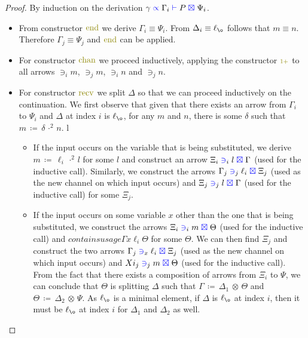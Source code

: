 \documentclass[a4paper,UKenglish,cleveref, autoref, thm-restate,authorcolumns]{lipics-v2019}
\theoremstyle{definition}
\newcommand{\type}[1]{\textcolor{blue}{\operatorname{#1}}}
\newcommand{\constr}[1]{\textcolor{olive}{\operatorname{#1}}}
\newcommand{\suc}{\constr{\scriptstyle 1+}}
\newcommand{\opsquared}[3]{#1 \, \coloneqq \, #2 \, \cdot^2 \, #3}
\newcommand{\opctx}[3]{#1 \, \coloneqq \, #2 \, \otimes \, #3}
\newcommand{\li}{\ell_i}
\newcommand{\lz}{\ell_{\o}}
\newcommand{\types}[4]{#1 \; \type{\propto} \; #2 \; \type{\vdash} \; #3 \; \type{\boxtimes} \; #4}
\newcommand{\containsusage}[4]{#1 \; \type{\ni}_{#2} \; #3 \; \type{\boxtimes} \; #4}
\begin{document}
\begin{proof}
  By induction on the derivation $\types{\gamma}{\Gamma_i}{P}{\Psi_i}$.
  \begin{itemize}
    \item
      From constructor $\constr{end}$ we derive $\Gamma_i \equiv \Psi_i$.
      From $\Delta_i \equiv \lz$ follows that $m \equiv n$.
      Therefore $\Gamma_j \equiv \Psi_j$ and $\constr{end}$ can be applied.

    \item
      For constructor $\constr{chan}$ we proceed inductively, applying the constructor $\suc$ to all arrows $\ni_i m$, $\ni_j m$, $\ni_i n$ and $\ni_j n$.
      
    \item
      For constructor $\constr{recv}$ we split $\Delta$ so that we can proceed inductively on the continuation.
      We first observe that given that there exists an arrow from $\Gamma_i$ to $\Psi_i$ and $\Delta$ at index $i$ is $\lz$, for any $m$ and $n$, there is some $\delta$ such that $\opsquared{m}{\delta}{n}$.
 l     \begin{itemize}
        \item
          If the input occurs on the variable that is being substituted, we derive $\opsquared{m}{\li}{l}$ for some $l$ and construct an arrow $\containsusage{\Xi_i}{i}{l}{\Gamma}$ (used for the inductive call).
          Similarly, we construct the arrows $\containsusage{\Gamma_j}{j}{\li}{\Xi_j}$ (used as the new channel on which input occurs) and $\containsusage{\Xi_j}{j}{l}{\Gamma}$ (used for the inductive call) for some $\Xi_j$.
        \item
          If the input occurs on some variable $x$ other than the one that is being substituted, we construct the arrows $\containsusage{\Xi_i}{i}{m}{\Theta}$ (used for the inductive call) and $containsusage{\Gamma}{x}{\li}{\Theta}$ for some $\Theta$.
          We can then find $\Xi_j$ and construct the two arrows $\containsusage{\Gamma_j}{x}{\li}{\Xi_j}$ (used as the new channel on which input occurs) and $\containsusage{Xi_j}{j}{m}{\Theta}$ (used for the inductive call).
          From the fact that there exists a composition of arrows from $\Xi_i$ to $\Psi$, we can conclude that $\Theta$ is splitting $\Delta$ such that $\opctx{\Gamma}{\Delta_1}{\Theta}$ and $\opctx{\Theta}{\Delta_2}{\Psi}$.
          As $\lz$ is a minimal element, if $\Delta$ is $\lz$ at index $i$, then it must be $\lz$ at index $i$ for $\Delta_1$ and $\Delta_2$ as well.
      \end{itemize}


\end{itemize}
\end{proof}
\end{document}

